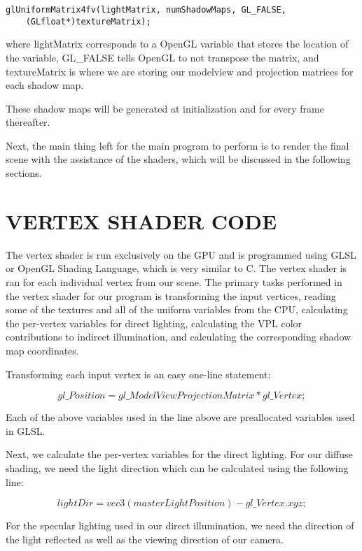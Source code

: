 \begin{lstlisting}
glUniformMatrix4fv(lightMatrix, numShadowMaps, GL_FALSE, 
	(GLfloat*)textureMatrix);
\end{lstlisting}

where lightMatrix corresponds to a OpenGL variable that stores the location of the variable, GL\_FALSE tells OpenGL to not transpose the matrix, and textureMatrix is where we are storing our modelview and projection matrices for each shadow map.

These shadow maps will be generated at initialization and for every frame thereafter.  

Next, the main thing left for the main program to perform is to render the final scene with the assistance of the shaders, which will be discussed in the following sections.

\section{VERTEX SHADER CODE}

The vertex shader is run exclusively on the GPU and is programmed using GLSL or OpenGL Shading Language, which is very similar to C.  The vertex shader is ran for each individual vertex from our scene.  The primary tasks performed in the vertex shader for our program is transforming the input vertices, reading some of the textures and all of the uniform variables from the CPU, calculating the per-vertex variables for direct lighting, calculating the VPL color contributions to indirect illumination, and calculating the corresponding shadow map coordinates.

Transforming each input vertex is an easy one-line statement:


\begin{equation}
gl\_Position = gl\_ModelViewProjectionMatrix * gl\_Vertex;
\end{equation}

Each of the above variables used in the line above are preallocated variables used in GLSL.

Next, we calculate the per-vertex variables for the direct lighting.  For our diffuse shading, we need the light direction which can be calculated using the following line:


\begin{equation}
lightDir = vec3(masterLightPosition) - gl\_Vertex.xyz;
\end{equation}

For the specular lighting used in our direct illumination, we need the direction of the light reflected as well as the viewing direction of our camera.


